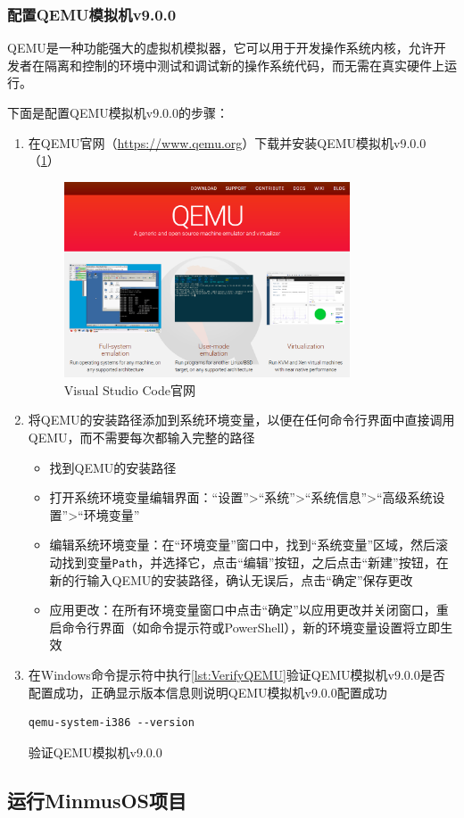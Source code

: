 \subsubsection{配置QEMU模拟机v9.0.0}

QEMU是一种功能强大的虚拟机模拟器，它可以用于开发操作系统内核，允许开发者在隔离和控制的环境中测试和调试新的操作系统代码，而无需在真实硬件上运行。

下面是配置QEMU模拟机v9.0.0的步骤：

\begin{enumerate}
    \item 在QEMU官网（\url{https://www.qemu.org}）下载并安装QEMU模拟机v9.0.0（\cref{fig:QEMUWebsite}）
          \begin{figure}[htbp]
              \centering
              \includegraphics[width=0.8\textwidth]{figures/QEMUWebsite.png}
              \caption{Visual Studio Code官网}
              \label{fig:QEMUWebsite}
          \end{figure}
    \item 将QEMU的安装路径添加到系统环境变量，以便在任何命令行界面中直接调用QEMU，而不需要每次都输入完整的路径
          \begin{itemize}
              \item 找到QEMU的安装路径
              \item 打开系统环境变量编辑界面：“设置”>“系统”>“系统信息”>“高级系统设置”>“环境变量”
              \item 编辑系统环境变量：在“环境变量”窗口中，找到“系统变量”区域，然后滚动找到变量\texttt{Path}，并选择它，点击“编辑”按钮，之后点击“新建”按钮，在新的行输入QEMU的安装路径，确认无误后，点击“确定”保存更改
              \item 应用更改：在所有环境变量窗口中点击“确定”以应用更改并关闭窗口，重启命令行界面（如命令提示符或PowerShell），新的环境变量设置将立即生效
          \end{itemize}
    \item 在Windows命令提示符中执行\cref{lst:VerifyQEMU}验证QEMU模拟机v9.0.0是否配置成功，正确显示版本信息则说明QEMU模拟机v9.0.0配置成功
          \begin{listing}[htbp]
              \begin{verbatim}
qemu-system-i386 --version
          \end{verbatim}
              \caption{验证QEMU模拟机v9.0.0}\label{lst:VerifyQEMU}
          \end{listing}
\end{enumerate}

\subsection{运行MinmusOS项目}